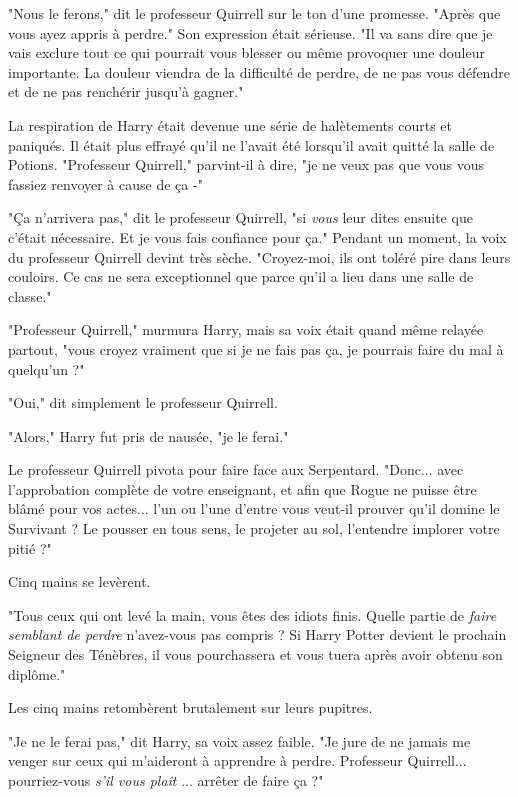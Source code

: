 "Nous le ferons," dit le professeur Quirrell sur le ton d'une promesse. "Après que vous ayez appris à perdre." Son expression était sérieuse. "Il va sans dire que je vais exclure tout ce qui pourrait vous blesser ou même provoquer une douleur importante. La douleur viendra de la difficulté de perdre, de ne pas vous défendre et de ne pas renchérir jusqu'à gagner."

La respiration de Harry était devenue une série de halètements courts et paniqués. Il était plus effrayé qu'il ne l'avait été lorsqu'il avait quitté la salle de Potions. "Professeur Quirrell," parvint-il à dire, "je ne veux pas que vous vous fassiez renvoyer à cause de ça -"

"Ça n'arrivera pas," dit le professeur Quirrell, "si \emph{vous}  leur dites ensuite que c'était nécessaire. Et je vous fais confiance pour ça." Pendant un moment, la voix du professeur Quirrell devint très sèche. "Croyez-moi, ils ont toléré pire dans leurs couloirs. Ce cas ne sera exceptionnel que parce qu'il a lieu dans une salle de classe."

"Professeur Quirrell," murmura Harry, mais sa voix était quand même relayée partout, "vous croyez vraiment que si je ne fais pas ça, je pourrais faire du mal à quelqu'un ?"

"Oui," dit simplement le professeur Quirrell.

"Alors," Harry fut pris de nausée, "je le ferai."

Le professeur Quirrell pivota pour faire face aux Serpentard. "Donc... avec l'approbation complète de votre enseignant, et afin que Rogue ne puisse être blâmé pour vos actes... l'un ou l'une d'entre vous veut-il prouver qu'il domine le Survivant ? Le pousser en tous sens, le projeter au sol, l'entendre implorer votre pitié ?"

Cinq mains se levèrent.

"Tous ceux qui ont levé la main, vous êtes des idiots finis. Quelle partie de \emph{faire semblant de perdre}  n'avez-vous pas compris ? Si Harry Potter devient le prochain Seigneur des Ténèbres, il vous pourchassera et vous tuera après avoir obtenu son diplôme."

Les cinq mains retombèrent brutalement sur leurs pupitres.

"Je ne le ferai pas," dit Harry, sa voix assez faible. "Je jure de ne jamais me venger sur ceux qui m'aideront à apprendre à perdre. Professeur Quirrell... pourriez-vous \emph{s'il vous plaît} ... arrêter de faire ça ?"

